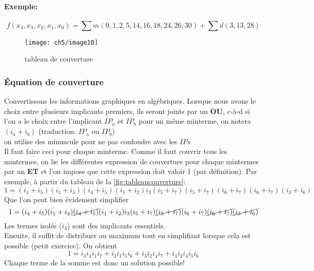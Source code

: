 \paragraph{Exemple:}
\begin{equation*}
	f(x_4,x_3,x_2,x_1,x_0)=\sum m(0,1,2,5,14,16,18,24,26,30)+\sum d(3,13,28)
\end{equation*}
\begin{figure}[H]
	\hspace{-1.5cm}
	\texttt{[image: ch5/image10]}
	\caption{tableau de couverture}
	\label{fig:tableaucouverture}
\end{figure}
\subsubsection{Équation de couverture}
Convertissons les informations graphiques en algébriques. Lorsque nous avons le choix entre plusieurs implicants premiers, ils seront joints par un \textbf{OU}, c-à-d si l'on a le choix entre l'implicant $IP_a$ et $IP_b$ pour un même minterme, on notera $(i_a+i_b)$ (traduction: $IP_a$ ou $IP_b$)\\
\danger on utilise des minuscule pour ne pas confondre avec les $IPs$\\

Il faut faire ceci pour chaque minterme. Comme il faut couvrir tous les mintermes, on lie les différentes expression de couverture pour chaque mintermes par un \textbf{ET} et l'on impose que cette expression doit valoir 1 (par définition). Par exemple, à partir du tableau de la \autoref{fig:tableaucouverture}:
\begin{equation}
	1=(i_4+i_5)(i_1 +i_4)(i_4+i_5)(i_1+i_2)i_3(i_5+i_7)(i_5+i_7)(i_6+i_7)(i_6+i_7)(i_3+i_6)
\end{equation}
Que l'on peut bien évidement simplifier
\begin{equation}
	1=(i_4+i_5)(i_1 +i_4)\cancel{(i_4+i_5)}(i_1+i_2)i_3(i_5+i_7)\cancel{(i_5+i_7)}(i_6+i_7)\cancel{(i_6+i_7)}\cancel{(i_3+i_6)}
\end{equation}
Les termes isolés ($i_3$) sont des implicants essentiels.\\
Ensuite, il suffit de distribuer au maximum tout en simplifiant lorsque cela est possible (petit exercice). On obtient
\begin{equation}
	1=i_3i_4i_1i_7+i_3i_1i_5i_6+i_3i_2i_4i_7+i_3i_2i_4i_5i_6
\end{equation}
Chaque terme de la somme est donc un solution possible!\\

